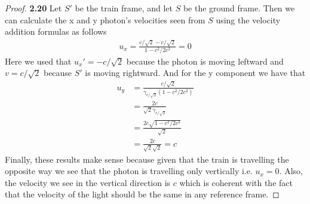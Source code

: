\documentclass[11pt]{article}
\theoremstyle{definition}
\begin{document}
	\begin{proof}{\textbf{2.20}}
        Let $S'$ be the train frame, and let $S$ be the ground frame. Then we can
        calculate the x and y photon's velocities seen from $S$ using the velocity
        addition formulas as follows
        \begin{align*}
            u_x = \frac{c/\sqrt{2} - c/\sqrt{2}}{1 - c^2/2c^2} = 0
        \end{align*}
        Here we used that $u_x' = -c/\sqrt{2}$ because the photon is moving leftward and
        $v = c/\sqrt{2}$ because $S'$ is moving rightward. And for the y component we
        have that
        \begin{align*}
            u_y &= \frac{c/\sqrt{2}}{\gamma_{c/\sqrt{2}}(1 - c^2/2c^2)}\\
                &= \frac{2c}{\sqrt{2} \gamma_{c/\sqrt{2}}}\\
                &= \frac{2c\sqrt{1-c^2/2c^2}}{\sqrt{2}}\\
                &= \frac{2c}{\sqrt{2}\sqrt{2}} = c
        \end{align*}
        Finally, these results make sense because given that the train is travelling the
        opposite way we see that the photon is travelling only vertically i.e. $u_x = 0$.
        Also, the velocity we see in the vertical direction is $c$ which is coherent
        with the fact that the velocity of the light should be the same in any reference
        frame.    
    \end{proof}
\end{document}
